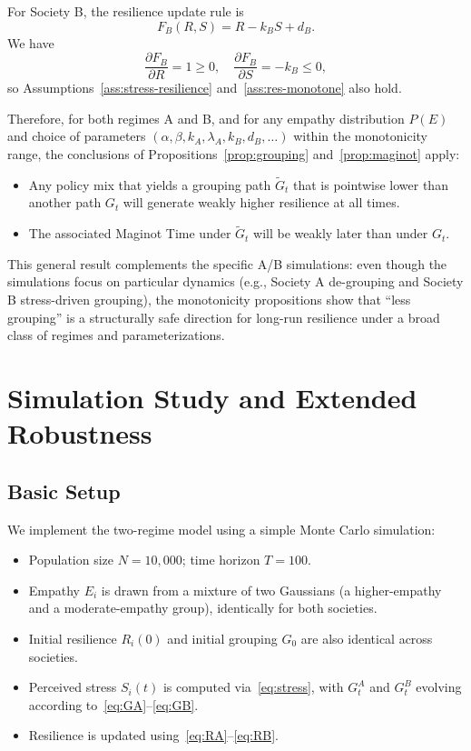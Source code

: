 \documentclass[11pt]{article}
\theoremstyle{plain}
\begin{document}
For Society B, the resilience update rule is
\[
F_B(R,S) = R - k_B S + d_B.
\]
We have
\[
\frac{\partial F_B}{\partial R} = 1 \ge 0, \quad
\frac{\partial F_B}{\partial S} = -k_B \le 0,
\]
so Assumptions~\ref{ass:stress-resilience} and~\ref{ass:res-monotone} also hold.

Therefore, for both regimes A and B, and for any empathy distribution $P(E)$ and choice of parameters $(\alpha,\beta,k_A,\lambda_A,k_B,d_B,\dots)$ within the monotonicity range, the conclusions of Propositions~\ref{prop:grouping} and~\ref{prop:maginot} apply:
\begin{itemize}
  \item Any policy mix that yields a grouping path $\tilde{G}_t$ that is pointwise lower than another path $G_t$ will generate weakly higher resilience at all times.
  \item The associated Maginot Time under $\tilde{G}_t$ will be weakly later than under $G_t$.
\end{itemize}

This general result complements the specific A/B simulations:
even though the simulations focus on particular dynamics (e.g., Society A de-grouping and Society B stress-driven grouping), the monotonicity propositions show that ``less grouping'' is a structurally safe direction for long-run resilience under a broad class of regimes and parameterizations.

\section{Simulation Study and Extended Robustness}
\label{sec:simulation}

\subsection{Basic Setup}

We implement the two-regime model using a simple Monte Carlo simulation:
\begin{itemize}
  \item Population size $N = 10{,}000$; time horizon $T = 100$.
  \item Empathy $E_i$ is drawn from a mixture of two Gaussians (a higher-empathy and a moderate-empathy group), identically for both societies.
  \item Initial resilience $R_i(0)$ and initial grouping $G_0$ are also identical across societies.
  \item Perceived stress $S_i(t)$ is computed via~\eqref{eq:stress}, with $G_t^A$ and $G_t^B$ evolving according to~\eqref{eq:GA}--\eqref{eq:GB}.
  \item Resilience is updated using~\eqref{eq:RA}--\eqref{eq:RB}.
\end{itemize}
\end{document}
